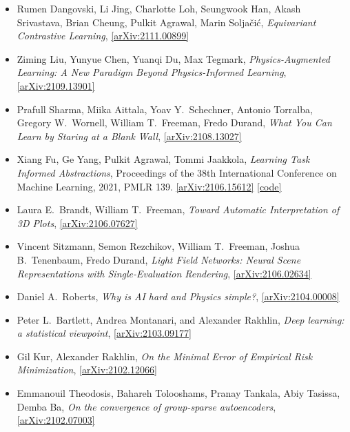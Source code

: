 \begin{itemize}
\item Rumen Dangovski, Li Jing, Charlotte Loh, Seungwook Han, Akash Srivastava, Brian Cheung, Pulkit Agrawal, Marin Soljačić, \textit{Equivariant Contrastive Learning}, \href{https://arxiv.org/abs/2111.00899}{[arXiv:2111.00899]} 
\item Ziming Liu, Yunyue Chen, Yuanqi Du, Max Tegmark, \textit{Physics-Augmented Learning: A New Paradigm Beyond Physics-Informed Learning}, \href{https://arxiv.org/abs/2109.13901}{[arXiv:2109.13901]} 
\item Prafull Sharma, Miika Aittala, Yoav Y.\  Schechner, Antonio Torralba, Gregory W.\  Wornell, William T.\  Freeman, Fredo Durand, \textit{What You Can Learn by Staring at a Blank Wall}, \href{https://arxiv.org/abs/2108.13027}{[arXiv:2108.13027]} 
\item Xiang Fu, Ge Yang, Pulkit Agrawal, Tommi Jaakkola, \textit{Learning Task Informed Abstractions}, Proceedings of the 38th International Conference on Machine Learning, 2021, PMLR 139. \href{https://arxiv.org/abs/2106.15612}{[arXiv:2106.15612]}  \href{https://xiangfu.co/tia}{[code]} 
\item Laura E.\  Brandt, William T.\  Freeman, \textit{Toward Automatic Interpretation of 3D Plots}, \href{https://arxiv.org/abs/2106.07627}{[arXiv:2106.07627]} 
\item Vincent Sitzmann, Semon Rezchikov, William T.\  Freeman, Joshua B.\  Tenenbaum, Fredo Durand, \textit{Light Field Networks: Neural Scene Representations with Single-Evaluation Rendering}, \href{https://arxiv.org/abs/2106.02634}{[arXiv:2106.02634]} 
\item Daniel A.\  Roberts, \textit{Why is AI hard and Physics simple?}, \href{https://arxiv.org/abs/2104.00008}{[arXiv:2104.00008]} 
\item Peter L.\  Bartlett, Andrea Montanari, and Alexander Rakhlin, \textit{Deep learning: a statistical viewpoint}, \href{https://arxiv.org/abs/2103.09177}{[arXiv:2103.09177]} 
\item Gil Kur, Alexander Rakhlin, \textit{On the Minimal Error of Empirical Risk Minimization}, \href{https://arxiv.org/abs/2102.12066}{[arXiv:2102.12066]} 
\item Emmanouil Theodosis, Bahareh Tolooshams, Pranay Tankala, Abiy Tasissa, Demba Ba, \textit{On the convergence of group-sparse autoencoders}, \href{https://arxiv.org/abs/2102.07003}{[arXiv:2102.07003]} 
\end{itemize}